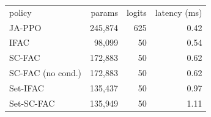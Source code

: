 \begin{tabular}{lrrr}
\hline
policy & params & logits & latency (ms)\\
JA-PPO & 245,874 & 625 & 0.42\\
IFAC & 98,099 & 50 & 0.54\\
SC-FAC & 172,883 & 50 & 0.62\\
SC-FAC (no cond.) & 172,883 & 50 & 0.62\\
Set-IFAC & 135,437 & 50 & 0.97\\
Set-SC-FAC & 135,949 & 50 & 1.11\\
\hline
\end{tabular}